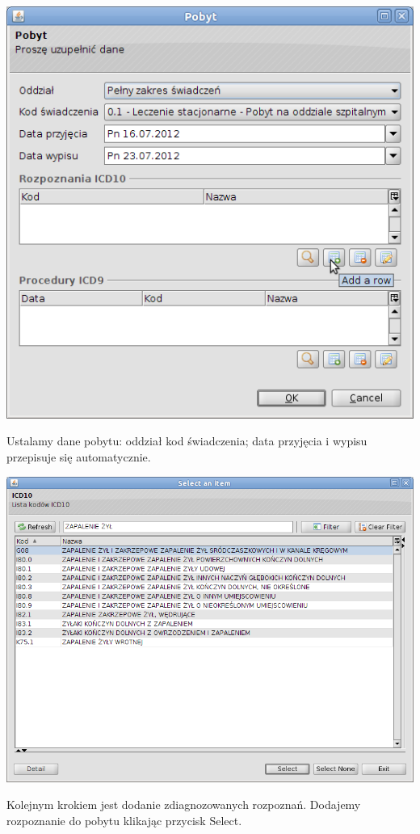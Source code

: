 \includegraphics[scale=0.4]{images/gruper2}

Ustalamy dane pobytu: oddział kod świadczenia; data przyjęcia i wypisu przepisuje się automatycznie.

\includegraphics[scale=0.4]{images/gruper3}

Kolejnym krokiem jest dodanie zdiagnozowanych rozpoznań. Dodajemy rozpoznanie do pobytu klikając przycisk Select.

